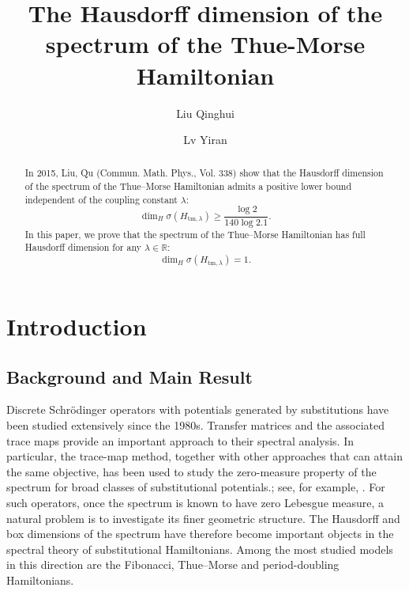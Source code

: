 \documentclass{amsart}
\title{The Hausdorff dimension of the spectrum of the Thue-Morse Hamiltonian}
\author{Liu Qinghui}
\author{Lv Yiran}
\date{}
\theoremstyle{definition}
\begin{document}
\begin{abstract}
In 2015, Liu, Qu (Commun. Math. Phys., Vol. 338) show that the Hausdorff dimension of the spectrum of the Thue–Morse Hamiltonian admits a positive lower bound independent of the coupling constant $\lambda$:
$$\dim_H \sigma(H_{\mathrm{tm},\lambda})\ge\frac{\log 2}{140\log 2.1}.$$
In this paper, we prove that the spectrum of the Thue--Morse Hamiltonian has full Hausdorff dimension for any $\lambda\in\mathbb{R}$:
\[
\dim_H \sigma(H_{\mathrm{tm},\lambda})=1.
\]
\end{abstract}
\maketitle



\section{Introduction}

\subsection{Background and Main Result}

Discrete Schr\"odinger operators with potentials generated by
substitutions have been studied extensively since the 1980s.
Transfer matrices and the associated trace maps provide an important
approach to their spectral analysis. 
In particular, the trace-map method, 
together with other approaches that can attain the same objective, 
has been used to study the zero-measure property of 
the spectrum for broad classes of substitutional potentials.; 
see, for example, \cite{BG93,LTWW02, Lenz02, DL06}. 
For such operators, once the spectrum is known to
have zero Lebesgue measure, a natural problem is to investigate its
finer geometric structure. The Hausdorff and box dimensions of the
spectrum have therefore become important objects in the spectral theory
of substitutional Hamiltonians. Among the most studied models in this
direction are the Fibonacci, Thue--Morse and period-doubling
Hamiltonians.
\end{document}
